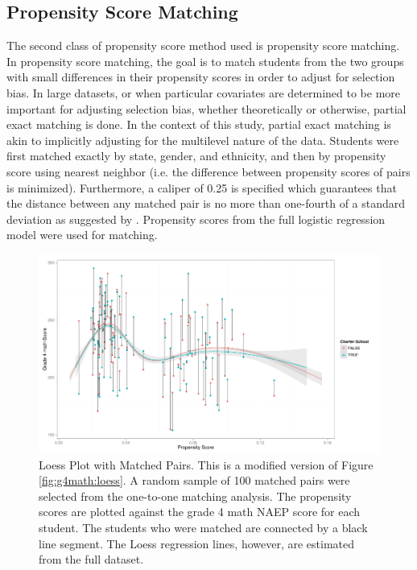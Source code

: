 \documentclass[letterpaper,12pt]{article} %
\begin{document}
\clearpage




\subsection{Propensity Score Matching}

The second class of propensity score method used is propensity score matching. In propensity score matching, the goal is to match students from the two groups with small differences in their propensity scores in order to adjust for selection bias. In large datasets, or when particular covariates are determined to be more important for adjusting selection bias, whether theoretically or otherwise, partial exact matching is done. In the context of this study, partial exact matching is akin to implicitly adjusting for the multilevel nature of the data. Students were first matched exactly by state, gender, and ethnicity, and then by propensity score using nearest neighbor (i.e. the difference between propensity scores of pairs is minimized). Furthermore, a caliper of 0.25 is specified which guarantees that the distance between any matched pair is no more than one-fourth of a standard deviation as suggested by . Propensity scores from the full logistic regression model were used for matching.

\setlength{\belowcaptionskip}{-10pt}
\begin{figure}[t]
\begin{center}
\includegraphics[width=\textwidth]{../Figures2009/g4math-loess-matching.pdf}
\caption[Loess Plot with Matched Pairs]{Loess Plot with Matched Pairs. This is a modified version of Figure \ref{fig:g4math:loess}. A random sample of 100 matched pairs were selected from the one-to-one matching analysis. The propensity scores are plotted against the grade 4 math NAEP score for each student. The students who were matched are connected by a black line segment. The Loess regression lines, however, are estimated from the full dataset.}
\label{fig:g4math:loessmatching}
\end{center}
\end{figure}
\setlength{\belowcaptionskip}{0pt}
\end{document}
